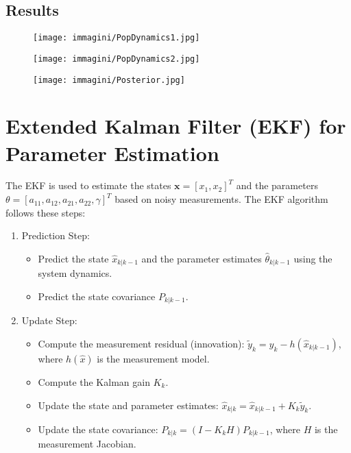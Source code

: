 \documentclass[a4paper,10pt]{report}
\begin{document}
\subsection{Results}

\begin{figure}[h!]
	\centering
	\begin{minipage}{0.45\textwidth}
		\centering
		\texttt{[image: immagini/PopDynamics1.jpg]}
		\label{fig:immagine1}
	\end{minipage}
	\hfill
	\begin{minipage}{0.45\textwidth}
		\centering
		\texttt{[image: immagini/PopDynamics2.jpg]}
		\label{fig:immagine2}
	\end{minipage}
\end{figure}
\begin{figure}[h]
	\centering
	\texttt{[image: immagini/Posterior.jpg]}
\end{figure}

\section{Extended Kalman Filter (EKF) for Parameter Estimation}

The EKF is used to estimate the states \( \mathbf{x} = [x_1, x_2]^T \) and the parameters \( \theta = [a_{11}, a_{12}, a_{21}, a_{22}, \gamma]^T \) based on noisy measurements. The EKF algorithm follows these steps:

\begin{enumerate}

\item Prediction Step:
\begin{itemize}
\item Predict the state \( \hat{x}_{k|k-1} \) and the parameter estimates \( \hat{\theta}_{k|k-1} \) using the system dynamics.
\item Predict the state covariance \( P_{k|k-1} \).
\end{itemize}

\item Update Step:
\begin{itemize}
\item Compute the measurement residual (innovation): \( \tilde{y}_k = y_k - h(\hat{x}_{k|k-1}) \), where \( h(\hat{x}) \) is the measurement model.
\item Compute the Kalman gain \( K_k \).
\item Update the state and parameter estimates: \( \hat{x}_{k|k} = \hat{x}_{k|k-1} + K_k \tilde{y}_k \).
\item Update the state covariance: \( P_{k|k} = (I - K_k H) P_{k|k-1} \), where \( H \) is the measurement Jacobian.
\end{itemize}
\end{enumerate}
\end{document}
